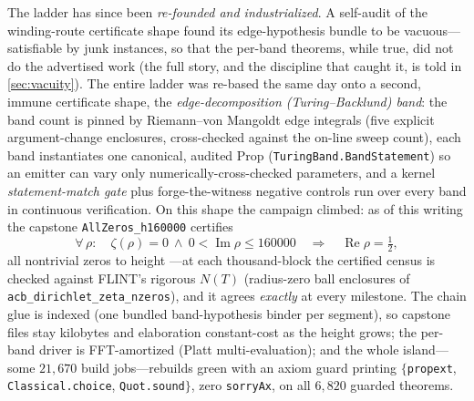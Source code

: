 The ladder has since been \emph{re-founded and industrialized}. A self-audit of
the winding-route certificate shape found its edge-hypothesis bundle to be
vacuous---satisfiable by junk instances, so that the per-band theorems, while
true, did not do the advertised work (the full story, and the discipline that
caught it, is told in \cref{sec:vacuity}). The entire ladder was re-based the
same day onto a second, immune certificate shape, the \emph{edge-decomposition
(Turing--Backlund) band}: the band count is pinned by
Riemann--von Mangoldt edge integrals (five explicit argument-change enclosures,
cross-checked against the on-line sweep count), each band instantiates one
canonical, audited Prop (\texttt{TuringBand.BandStatement}) so an emitter can
vary only numerically-cross-checked parameters, and a kernel
\emph{statement-match gate} plus forge-the-witness negative controls run over
every band in continuous verification. On this shape the campaign climbed: as
of this writing the capstone \texttt{AllZeros\_h160000} certifies
\[
  \forall\, \rho:\quad \zeta(\rho) = 0 \ \wedge\ 0 < \operatorname{Im}\rho \le 160000
  \quad\Longrightarrow\quad \operatorname{Re}\rho = \tfrac12,
\]
all \ladderCount{} nontrivial zeros to height \ladderHeight{}---at each
thousand-block the certified census is checked against FLINT's rigorous
$N(T)$ (radius-zero ball enclosures of \texttt{acb\_dirichlet\_zeta\_nzeros}),
and it agrees \emph{exactly} at every milestone. The chain glue is indexed
(one bundled band-hypothesis binder per segment), so capstone files stay
kilobytes and elaboration constant-cost as the height grows; the per-band
driver is FFT-amortized (Platt multi-evaluation); and the whole island---some
$21{,}670$ build jobs---rebuilds green with an axiom guard printing
$\{$\texttt{propext}, \texttt{Classical.choice}, \texttt{Quot.sound}$\}$, zero
\texttt{sorryAx}, on all $6{,}820$ guarded theorems.

